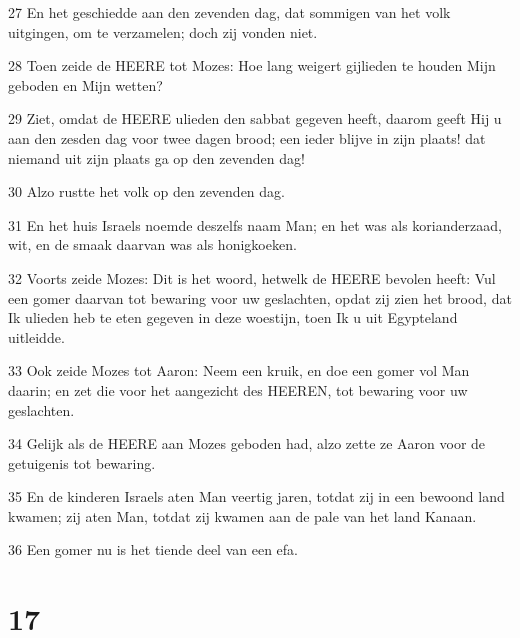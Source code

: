 \par 27 En het geschiedde aan den zevenden dag, dat sommigen van het volk uitgingen, om te verzamelen; doch zij vonden niet.
\par 28 Toen zeide de HEERE tot Mozes: Hoe lang weigert gijlieden te houden Mijn geboden en Mijn wetten?
\par 29 Ziet, omdat de HEERE ulieden den sabbat gegeven heeft, daarom geeft Hij u aan den zesden dag voor twee dagen brood; een ieder blijve in zijn plaats! dat niemand uit zijn plaats ga op den zevenden dag!
\par 30 Alzo rustte het volk op den zevenden dag.
\par 31 En het huis Israels noemde deszelfs naam Man; en het was als korianderzaad, wit, en de smaak daarvan was als honigkoeken.
\par 32 Voorts zeide Mozes: Dit is het woord, hetwelk de HEERE bevolen heeft: Vul een gomer daarvan tot bewaring voor uw geslachten, opdat zij zien het brood, dat Ik ulieden heb te eten gegeven in deze woestijn, toen Ik u uit Egypteland uitleidde.
\par 33 Ook zeide Mozes tot Aaron: Neem een kruik, en doe een gomer vol Man daarin; en zet die voor het aangezicht des HEEREN, tot bewaring voor uw geslachten.
\par 34 Gelijk als de HEERE aan Mozes geboden had, alzo zette ze Aaron voor de getuigenis tot bewaring.
\par 35 En de kinderen Israels aten Man veertig jaren, totdat zij in een bewoond land kwamen; zij aten Man, totdat zij kwamen aan de pale van het land Kanaan.
\par 36 Een gomer nu is het tiende deel van een efa.

\chapter{17}


